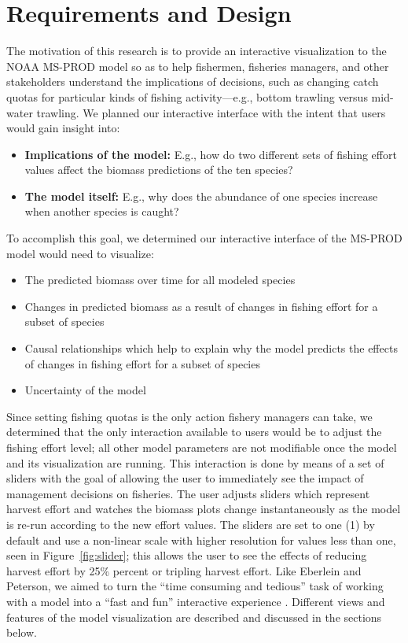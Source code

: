 \chapter{Requirements and Design}

The motivation of this research is to provide an interactive visualization to the NOAA MS-PROD model so as to help fishermen, fisheries managers, and other stakeholders understand the implications of decisions, such as changing catch quotas for particular kinds of fishing activity---e.g., bottom trawling versus mid-water trawling.  We planned our interactive interface with the intent that users would gain insight into:

\begin{itemize}
	\item \textbf{Implications of the model:}  E.g., how do two different sets of fishing effort values affect the biomass predictions of the ten species?
	\item \textbf{The model itself:}  E.g., why does the abundance of one species increase when another species is caught? 
\end{itemize} 

To accomplish this goal, we determined our interactive interface of the MS-PROD model would need to visualize:

\begin{itemize}
	\item The predicted biomass over time for all modeled species
	\item Changes in predicted biomass as a result of changes in fishing effort for a subset of species
	\item Causal relationships which help to explain why the model predicts the effects of changes in fishing effort for a subset of species
	\item Uncertainty of the model
\end{itemize} 

Since setting fishing quotas is the only action fishery managers can take, we determined that the only interaction available to users would be to adjust the fishing effort level; all other model parameters are not modifiable once the model and its visualization are running.  This interaction is done by means of a set of sliders with the goal of allowing the user to immediately see the impact of management decisions on fisheries.  The user adjusts sliders which represent harvest effort and watches the biomass plots change instantaneously as the model is re-run according to the new effort values.  The sliders are set to one (1) by default and use a non-linear scale with higher resolution for values less than one, seen in Figure~\ref{fig:slider}; this allows the user to see the effects of reducing harvest effort by 25\% percent or tripling harvest effort.  Like Eberlein and Peterson, we aimed to turn the ``time consuming and tedious'' task of working with a model into a ``fast and fun'' interactive experience \citeyearpar{eberlein1992}.  Different views and features of the model visualization are described and discussed in the sections below.  

